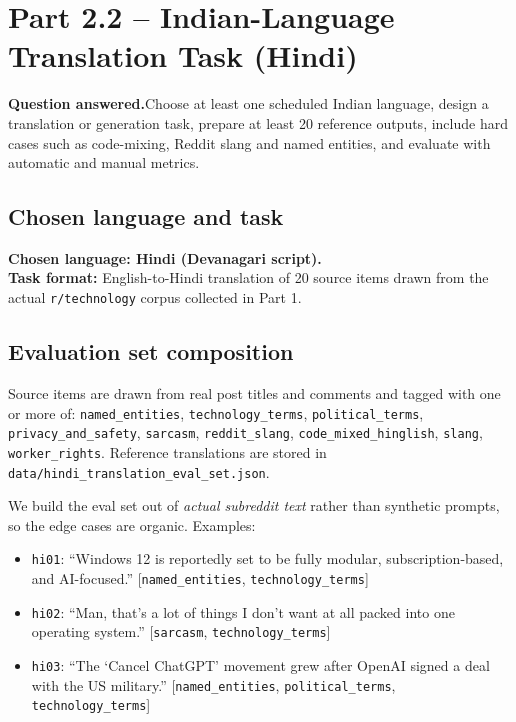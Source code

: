 \documentclass[11pt,a4paper]{article}
\newenvironment{designbox}{%
  \par\medskip\noindent
  \def\FrameCommand{\fboxsep=6pt\fboxrule=0.4pt%
    \fcolorbox{designboxrule}{designboxbg}}%
  \MakeFramed{\advance\hsize-2\fboxsep\FrameRestore}%
  \noindent{\sffamily\bfseries Design choice.}\quad\ignorespaces%
}{\endMakeFramed\par\medskip}
\newcommand{\questionanswered}[1]{%
  \par\medskip\noindent\textbf{Question answered.}\quad #1\par\medskip%
}
\begin{document}
\section{Part 2.2 -- Indian-Language Translation Task (Hindi)}
\label{sec:22}

\questionanswered{Choose at least one scheduled Indian language, design a translation or
generation task, prepare at least 20 reference outputs, include hard cases such as code-mixing,
Reddit slang and named entities, and evaluate with automatic and manual metrics.}

\subsection{Chosen language and task}

\textbf{Chosen language: Hindi (Devanagari script).} \\
\textbf{Task format:} English-to-Hindi translation of 20 source items drawn from the actual
\texttt{r/technology} corpus collected in Part 1.

\subsection{Evaluation set composition}
Source items are drawn from real post titles and comments and tagged with one or more of:
\texttt{named\_entities}, \texttt{technology\_terms}, \texttt{political\_terms},
\texttt{privacy\_and\_safety}, \texttt{sarcasm}, \texttt{reddit\_slang},
\texttt{code\_mixed\_hinglish}, \texttt{slang}, \texttt{worker\_rights}.
Reference translations are stored in
\texttt{data/hindi\_translation\_eval\_set.json}.

\begin{designbox}
We build the eval set out of \emph{actual subreddit text} rather than synthetic prompts, so the
edge cases are organic. Examples:
\begin{itemize}
  \item \texttt{hi01}: ``Windows 12 is reportedly set to be fully modular, subscription-based,
        and AI-focused.'' [\texttt{named\_entities}, \texttt{technology\_terms}]
  \item \texttt{hi02}: ``Man, that's a lot of things I don't want at all packed into one
        operating system.'' [\texttt{sarcasm}, \texttt{technology\_terms}]
  \item \texttt{hi03}: ``The `Cancel ChatGPT' movement grew after OpenAI signed a deal with the
        US military.'' [\texttt{named\_entities}, \texttt{political\_terms},
        \texttt{technology\_terms}]
\end{itemize}
\end{designbox}
\end{document}
